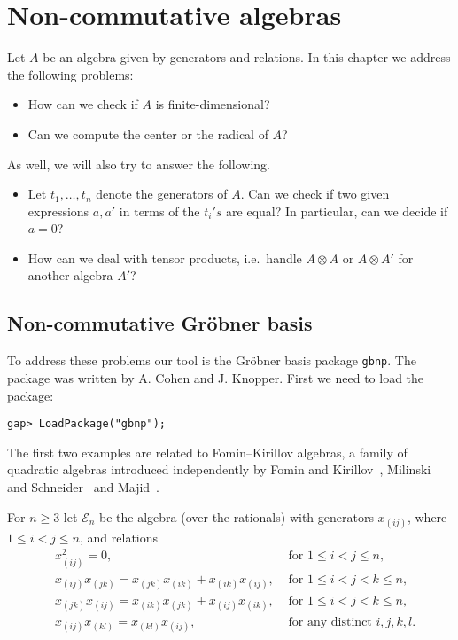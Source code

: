 \chapter{Non-commutative algebras}

\label{algebras}


Let $A$ be an algebra given by generators and relations. In this chapter we
address the following problems: 
\begin{itemize}
\item How can we check if $A$ is finite-dimensional? 
\item Can we compute the center or the radical of $A$? 
\end{itemize}
As well, we will also try to answer the following.
\begin{itemize}
	\item Let $t_1,\dots,t_n$ denote the generators of $A$. Can we check if two given expressions $a,a'$ in terms of the $t_i's$ are equal? In particular, can we decide if $a=0$?
	\item How can we deal with tensor products, i.e.~handle $A\otimes A$ or $A\otimes A'$ for another algebra $A'$? 
\end{itemize}


\section{Non-commutative Gr\"obner basis}

To address these problems our tool is the Gr\"obner basis package
\lstinline{gbnp}. The package was written by A. Cohen and J. Knopper. First we
need to load the package:
\begin{lstlisting}
gap> LoadPackage("gbnp");
\end{lstlisting}

The first two examples are related to Fomin--Kirillov algebras, a family of
quadratic algebras introduced independently by Fomin and
Kirillov~\cite{MR1667680}, Milinski and Schneider~\cite{MR1800714} and
Majid~\cite{MR2106930}. 

\begin{definition}
For $n\geq3$ let $\mathcal{E}_{n}$ be the algebra (over the rationals) with
generators $x_{(ij)}$, where $1\leq i<j\leq n$, and relations
\begin{align*}
	&x_{(ij)}^{2}=0,&\text{ for $1\leq i<j\leq n$,}\\
	&x_{(ij)}x_{(jk)}=x_{(jk)}x_{(ik)}+x_{(ik)}x_{(ij)},&\text{ for $1\leq i<j<k\leq
	n$,}\\
	&x_{(jk)}x_{(ij)}=x_{(ik)}x_{(jk)}+x_{(ij)}x_{(ik)},&\text{ for $1\leq i<j<k\leq n$,}\\
	&x_{(ij)}x_{(kl)}=x_{(kl)}x_{(ij)},&\text{ for any distinct $i,j,k,l$.}
\end{align*}
\end{definition}

